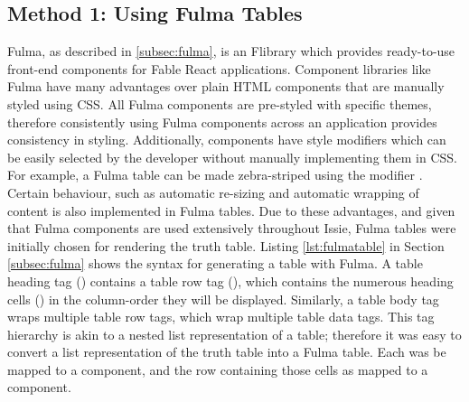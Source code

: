 \subsection{Method 1: Using Fulma Tables}
Fulma, as described in \ref{subsec:fulma}, is an F\fsharp library which provides ready-to-use front-end components for Fable React applications. Component libraries like Fulma have many advantages over plain HTML components that are manually styled using CSS. All Fulma components are pre-styled with specific themes, therefore consistently using Fulma components across an application provides consistency in styling. Additionally, components have style modifiers which can be easily selected by the developer without manually implementing them in CSS. For example, a Fulma table can be made zebra-striped using the  modifier \cite{fulmatable}. Certain behaviour, such as automatic re-sizing and automatic wrapping of content is also implemented in Fulma tables. Due to these advantages, and given that Fulma components are used extensively throughout Issie, Fulma tables were initially chosen for rendering the truth table.
Listing \ref{lst:fulmatable} in Section \ref{subsec:fulma} shows the syntax for generating a table with Fulma. A table heading tag () contains a table row tag (), which contains the numerous heading cells () in the column-order they will be displayed. Similarly, a table body  tag wraps multiple table row tags, which wrap multiple table data  tags. This tag hierarchy is akin to a nested list representation of a table; therefore it was easy to convert a list representation of the truth table into a Fulma table. Each  was be mapped to a  component, and the row containing those cells as mapped to a  component.

